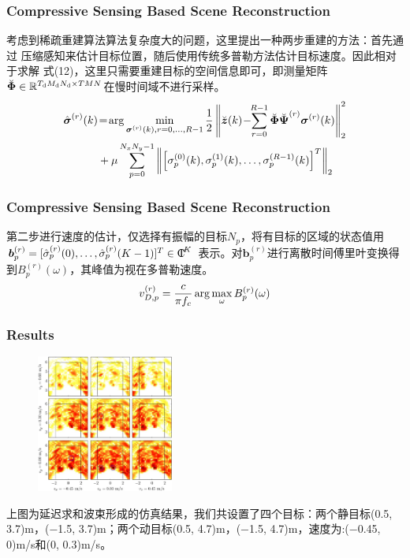 \documentclass[cjk]{beamer}
\begin{document}
  \begin{frame}
	\frametitle{Compressive Sensing Based Scene Reconstruction}
  考虑到稀疏重建算法算法复杂度大的问题，这里提出一种两步重建的方法：首先通过
  压缩感知来估计目标位置，随后使用传统多普勒方法估计目标速度。因此相对于求解
  式(12)，这里只需要重建目标的空间信息即可，即测量矩阵$\breve{\boldsymbol\Phi}\in\mathbb{R}^{T_{\rm d}M_{\rm d}N_{\rm d}\times TMN}$在慢时间域不进行采样。
  \begin{equation}
	\begin{split}
	\hat{\boldsymbol\sigma}^{(r)}(k)&\!=\!\arg\min_{{\boldsymbol\sigma}^{(r)}(k), r=0,\ldots, R-1}{1\over 2} \left\Vert\breve{\boldsymbol z}(k)\!-\!\!\sum_{r=0}^{R-1}\breve{\boldsymbol\Phi}\breve{\boldsymbol\Psi}^{(r)}{\boldsymbol\sigma}^{(r)}(k)\right\Vert_{2}^{2}\\
	&+\mu\sum_{p=0}^{N_{x}N_{y}-1}\left\Vert\left[\sigma_{p}^{(0)}(k),\sigma_{p}^{(1)}(k),\ldots,\sigma_{p}^{(R-1)}(k)\right]^{T}\right\Vert_{2}
  \end{split}
  \end{equation}
  \end{frame}
  \begin{frame}
	\frametitle{Compressive Sensing Based Scene Reconstruction}
  第二步进行速度的估计，仅选择有振幅的目标$N_p$，将有目标的区域的状态值用${\boldsymbol b}_{p}^{(r)}=[\hat{\sigma}_{p}^{(r)}(0),\ldots,\hat{\sigma}_{p}^{(r)}(K-1)]^{T}\in{{\rm C}{\hskip-5pt}{\rm I}}^{K}$
  表示。对${\boldsymbol b}_{p}^{(r)}$进行离散时间傅里叶变换得到$B_{p}^{(r)}(\omega)$，其峰值为视在多普勒速度。
  \begin{equation}
	v_{D, p}^{(r)}={c\over\pi f_{c}}\arg\max_{\omega}B_{p}^{(r)}(\omega)
  \end{equation}
  \end{frame}
  \begin{frame}
	\frametitle{Results}
	\begin{figure}
	  \centering
	  \includegraphics[width=0.4\textwidth]{fig4.jpg}
	\end{figure}
	上图为延迟求和波束形成的仿真结果，我们共设置了四个目标：两个静目标(0.5, 3.7)m，(−1.5, 3.7)m；两个动目标(0.5, 4.7)m，(−1.5, 4.7)m，速度为:(−0.45, 0)m/s和(0, 0.3)m/s。 
  \end{frame}
\end{document}
